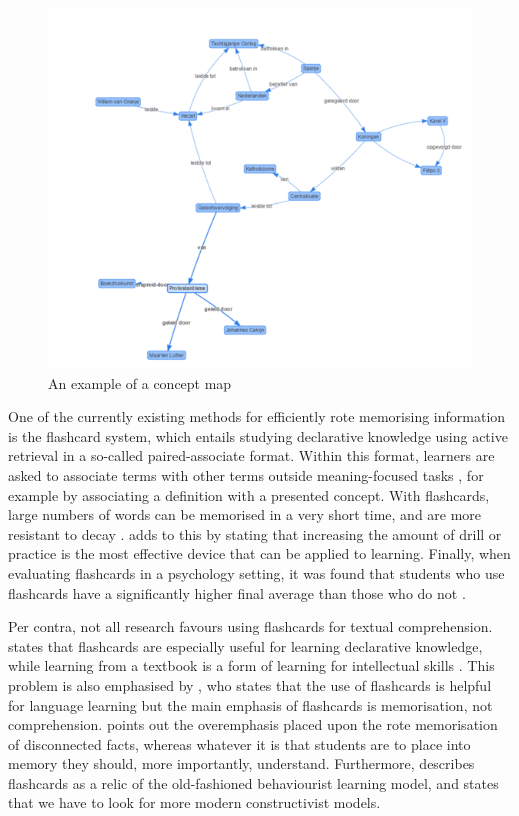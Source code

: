 \begin{figure}
    \centering
    \includegraphics[width=\textwidth]{img/conceptmap}
    \caption{An example of a concept map}
    \label{fig:conceptmap}
\end{figure}

One of the currently existing methods for efficiently rote memorising information is the flashcard system, which entails studying declarative knowledge using active retrieval in a so-called paired-associate format. Within this format, learners are asked to associate terms with other terms outside meaning-focused tasks \cite{nakata}, for example by associating a definition with a presented concept. With flashcards, large numbers of words can be memorised in a very short time, and are more resistant to decay \cite{nakata, joseph}.  adds to this by stating that increasing the amount of drill or practice is the most effective device that can be applied to learning. Finally, when evaluating flashcards in a psychology setting, it was found that students who use flashcards have a significantly higher final average than those who do not \cite{burgess, golding}.


Per contra, not all research favours using flashcards for textual comprehension.  states that flashcards are especially useful for learning declarative knowledge, while learning from a textbook is a form of learning for intellectual skills \cite{instructionaldesign}. This problem is also emphasised by , who states that the use of flashcards is helpful for language learning but the main emphasis of flashcards is memorisation, not comprehension.  points out the overemphasis placed upon the rote memorisation of disconnected facts, whereas whatever it is that students are to place into memory they should, more importantly, understand. Furthermore,  describes flashcards as a relic of the old-fashioned behaviourist learning model, and states that we have to look for more modern constructivist models.


